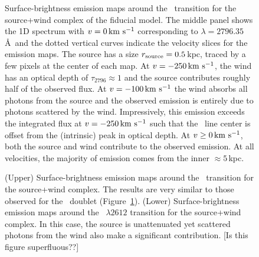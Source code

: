 \documentclass[12pt,preprint]{aastex}
\begin{document}
\begin{figure}
\caption{
Surface-brightness emission maps around the \mgiia\ transition for the
source+wind complex of the fiducial model.  The middle panel shows the
1D spectrum with $v=0 
\, {\rm km~s^{-1}}$ corresponding to $\lambda = 2796.35$\AA\ and the dotted vertical
curves indicate the velocity slices for the emission maps.  The
source has a size $r_{\rm source} = 0.5$\,kpc, traced by a few
pixels at the center of each map.   At $v=-250 \, {\rm km~s^{-1}}$, the wind has an optical
depth of $\tau_{2796} \approx 1$ and the source contributes
roughly half of the observed flux.  At $v=-100 \, {\rm km~s^{-1}}$ the
wind absorbs all photons from the source and the observed emission is
entirely due to photons scattered by the wind.  Impressively, this
emission exceeds the integrated flux at $v = -250\, {\rm km~s^{-1}}$ such that the
\mgiia\ line center is offset from the (intrinsic) peak in optical depth.  At $v \ge 0
\, {\rm km~s^{-1}}$,  both the source and wind contribute to the observed emission.
At all velocities, the majority of emission comes from the inner
$\approx 5$\,kpc.
}
\label{fig:fiducial_ifu_mgii}
\end{figure}

\begin{figure}
\caption{
(Upper) Surface-brightness emission maps around the \feiib\ transition for the
source+wind complex.  
The results are very similar to those observed for the \mgiid\ doublet
(Figure~\ref{fig:fiducial_ifu_mgii}).
(Lower) Surface-brightness emission maps around the ~$\lambda
2612$ transition for the 
source+wind complex.  %
In this case, the source is unattenuated yet scattered photons from
the wind also make a significant contribution. 
[Is this figure superfluous??]
}
\label{fig:fiducial_ifu_feii}
\end{figure}

\end{document}
